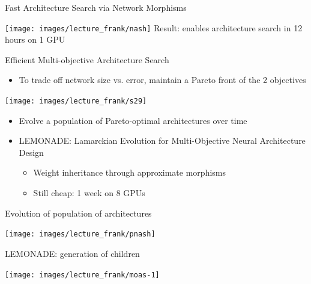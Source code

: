 \begin{frame}[c]{Fast Architecture Search via Network Morphisms}

{\centering
	\texttt{[image: images/lecture\_frank/nash]}
	Result: enables \alert{architecture search in 12 hours on 1 GPU}
}
\end{frame}
\begin{frame}[c]{Efficient Multi-objective Architecture Search}
\begin{itemize}
	\item To trade off network size vs. error,
	maintain a \alert{Pareto front} of the \alert{2 objectives}
\end{itemize}
{\centering
\texttt{[image: images/lecture\_frank/s29]}
}
\begin{itemize}
\item Evolve a population of Pareto-optimal architectures over time
\item \alert{LEMONADE}: Lamarckian Evolution for Multi-Objective Neural Architecture Design
\begin{itemize}
	\item Weight inheritance through approximate morphisms
	\item Still cheap: 1 week on 8 GPUs
\end{itemize}
\end{itemize}
\end{frame}
\begin{frame}[c]{Evolution of population of architectures}

{\centering \hspace*{1.25cm}
	\texttt{[image: images/lecture\_frank/pnash]}
}
\end{frame}
{
\begin{frame}[c]{LEMONADE: generation of children}

{\centering \hspace*{1.25cm}
	\texttt{[image: images/lecture\_frank/moas-1]}
}
\end{frame}
}
